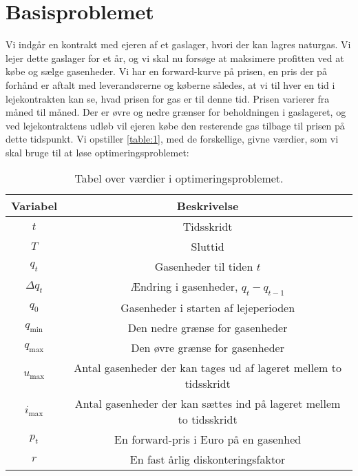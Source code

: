 \section{Basisproblemet}
Vi indgår en kontrakt med ejeren af et gaslager, hvori der kan lagres naturgas. Vi lejer dette gaslager for et år, og vi skal nu forsøge at maksimere profitten ved at købe og sælge gasenheder. Vi har en forward-kurve på prisen, en pris der på forhånd er aftalt med leverandørerne og køberne således, at vi til hver en tid i lejekontrakten kan se, hvad prisen for gas er til denne tid. Prisen varierer fra måned til måned. Der er øvre og nedre grænser for beholdningen i gaslageret, og ved lejekontraktens udløb vil ejeren købe den resterende gas tilbage til prisen på dette tidspunkt. Vi opstiller \autoref{table:1}, med de forskellige, givne værdier, som vi skal bruge til at løse optimeringsproblemet:

\begin{table}[h!]
\centering
\begin{tabular}{|c | c|} 
 \hline
 Variabel & Beskrivelse \\ [0.5ex] 
 \hline\hline
 $t$ & Tidsskridt  \\ 
 $T$ & Sluttid  \\
 $q_{t}$ & Gasenheder til tiden $t$  \\
 $\Delta q_{t}$ & Ændring i gasenheder,    $q_{t}-q_{t-1}$ \\
 $q_{0}$ & Gasenheder i starten af lejeperioden  \\
 $q_{\min}$ & Den nedre grænse for gasenheder \\ 
 $q_{\max}$ & Den øvre grænse for gasenheder \\
 $u_{\max}$ & Antal gasenheder der kan tages ud af lageret mellem to tidsskridt \\ 
 $i_{\max}$ & Antal gasenheder der kan sættes ind på lageret mellem to tidsskridt \\ 
 $p_{t}$ & En forward-pris i Euro på en gasenhed  \\
 $r$ & En fast årlig diskonteringsfaktor  \\
 [1ex]
 \hline
\end{tabular}
\caption{Tabel over værdier i optimeringsproblemet.}
\label{table:1}
\end{table}


